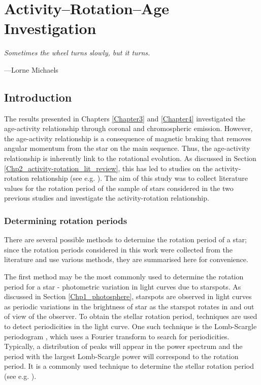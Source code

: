 
\chapter{Activity--Rotation--Age Investigation} %

\label{Chapter5} 

\epigraph{\itshape Sometimes the wheel turns slowly, but it turns.}{---Lorne Michaels}

\section{Introduction}

The results presented in Chapters \ref{Chapter3} and \ref{Chapter4} investigated the age-activity relationship through coronal and chromospheric emission. However, the age-activity relationship is a consequence of magnetic braking that removes angular momentum from the star on the main sequence. Thus, the age-activity relationship is inherently link to the rotational evolution. As discussed in Section \ref{Chp2_activity-rotation_lit_review}, this has led to studies on the activity-rotation relationship (see e.g. \citealt{Pizzolato_etal_2003,Wright_etal_2011}). The aim of this study was to collect literature values for the rotation period of the sample of stars considered in the two previous studies and investigate the activity-rotation relationship.

\subsection{Determining rotation periods}
\label{Chp5_Prot_methods}

There are several possible methods to determine the rotation period of a star; since the rotation periods considered in this work were collected from the literature and use various methods, they are summarised here for convenience.

The first method may be the most commonly used to determine the rotation period for a star - photometric variation in light curves due to starspots. As discussed in Section \ref{Chp1_photosphere}, starspots are observed in light curves as periodic variations in the brightness of star as the starspot rotates in and out of view of the observer. To obtain the stellar rotation period, techniques are used to detect periodicities in the light curve. One such technique is the Lomb-Scargle periodogram \citep{Lomb_1976,Scargle_1982}, which uses a Fourier transform to search for periodicities. Typically, a distribution of peaks will appear in the power spectrum and the period with the largest Lomb-Scargle power will correspond to the rotation period. It is a commonly used technique to determine the stellar rotation period (see e.g. \citealt{do_Nascimento_etal_2014,Nielsen_etal_2013}).

